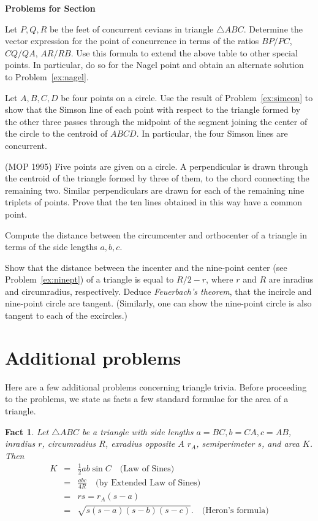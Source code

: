 \documentclass[12pt]{book}
\newcounter{exc}
\numberwithin{exc}{section}
\numberwithin{figure}{section}
\newenvironment{exer}{\vspace{0.1in}
\noindent \textbf{Problems for Section~\thesection} \vspace{0.1in}
\begin{list}{\arabic{exc}.}{\usecounter{exc}}}{\end{list}}
\newtheorem{fact}[theorem]{Fact}
\numberwithin{equation}{theorem}
\def\ii{\item}
\begin{document}
\begin{exer}
\ii
Let $P, Q, R$ be the feet of concurrent cevians in triangle $\triangle ABC$.
Determine the vector expression for the point of concurrence in terms
of the ratios $BP/PC$, $CQ/QA$, $AR/RB$. Use this formula to extend 
the above table to other special points. In particular, do so for the 
Nagel point and obtain an alternate solution to 
Problem~\ref{ex:nagel}.
\ii
Let $A,B,C,D$ be four points on a circle. Use the result of 
Problem~\ref{ex:simcon} to 
show that the Simson line of each point with respect 
to the triangle formed by the other three passes through the midpoint 
of the segment joining the center of the circle to the centroid of 
$ABCD$. In particular, the four Simson lines are concurrent.
\ii (MOP 1995) %
Five points are given on a circle. A perpendicular is drawn through 
the centroid of the triangle formed by three of them, to the chord 
connecting the remaining two. Similar perpendiculars are drawn for 
each of the remaining nine triplets of points. Prove that the ten 
lines obtained in this way have a common point.
\ii \label{ex:cirort} 
Compute the distance between the circumcenter and orthocenter of a 
triangle in terms of the side lengths $a,b,c$.
\ii
Show that the distance between the incenter and the nine-point 
center (see Problem~\ref{ex:ninept}) of a triangle
is equal to $R/2 - r$, where $r$ and $R$ are 
inradius and circumradius, respectively. Deduce \emph{Feuerbach's 
theorem}, that the incircle and nine-point circle are tangent. 
(Similarly, one can show the nine-point circle is also tangent to each of 
the excircles.)
\end{exer}

\section{Additional problems}

Here are a few additional problems concerning triangle trivia. Before 
proceeding to the problems, we state as facts a few standard formulae 
for the area of a triangle.

\begin{fact} \label{fact:area formulas}
Let $\triangle ABC$ be a 
triangle with side lengths $a = BC, b = CA, c = AB$, 
inradius $r$, circumradius $R$, exradius opposite $A$ $r_{A}$,
semiperimeter $s$, and area $K$. Then
\begin{eqnarray*}
K  &=& \frac{1}{2} ab \sin C \quad \mbox{(Law of Sines)}\\
&=& \frac{abc}{4R} \quad \mbox{(by Extended Law of Sines)} \\
&=& rs = r_{A} (s-a) \\
&=& \sqrt{s(s-a)(s-b)(s-c)}. \quad \mbox{(Heron's formula)}
\end{eqnarray*}
\end{fact}
\end{document}
